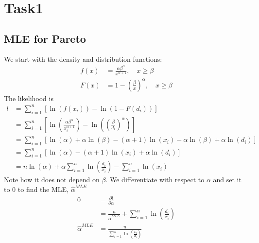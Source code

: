 \documentclass{article}
\begin{document}
	\appendix
	\section{Task1}
	\subsection{MLE for Pareto}
	We start with the density and distribution functions:
	\begin{align*}
	f(x) &= \frac{\alpha \beta^\alpha}{x^{\alpha + 1}}, \quad x\geq\beta\\
	F(x) &= 1-\left(\frac{\beta}{x}\right)^\alpha, \quad x \geq \beta
	\end{align*}
	The likelihood is 
	\begin{align*}
		l&=\sum_{i=1}^{n}\left[\ln(f(x_i)) - \ln(1-F(d_i))\right]\\
		&=\sum_{i=1}^{n}\left[\ln\left(\frac{\alpha \beta ^\alpha}{x_i ^ {\alpha + 1}}\right)-\ln\left(\left(\frac{\beta}{d_i}\right)^\alpha\right) \right]\\
		&=\sum_{i=1}^{n}\left[\ln(\alpha) + \alpha\ln(\beta)-(\alpha + 1)\ln(x_i)-\alpha\ln(\beta)+\alpha\ln(d_i)\right]\\
		&=\sum_{i=1}^{n}\left[\ln(\alpha) - (\alpha+1)\ln(x_i)+\alpha\ln(d_i)\right]\\
		&=n\ln(\alpha)+\alpha\sum_{i=1}^{n}\ln\left(\frac{d_i}{x_i}\right) - \sum_{i=1}^{n}\ln(x_i)
	\end{align*}
	Note how it does not depend on $\beta$. We differentiate with respect to $\alpha$ and set it to 0 to find the MLE, $\hat{\alpha}^{MLE}$
	\begin{align*}
		0 &=\frac{\partial l}{\partial \alpha} \\
		&=\frac{n}{\hat{\alpha}^{MLE}}+\sum_{i=1}^{n}\ln\left(\frac{d_i}{x_i}\right)\\
		\hat{\alpha}^{MLE} &= \frac{n}{\sum_{i=1}^{n}\ln\left(\frac{x_i}{d_i}\right)}
	\end{align*}
\end{document}
